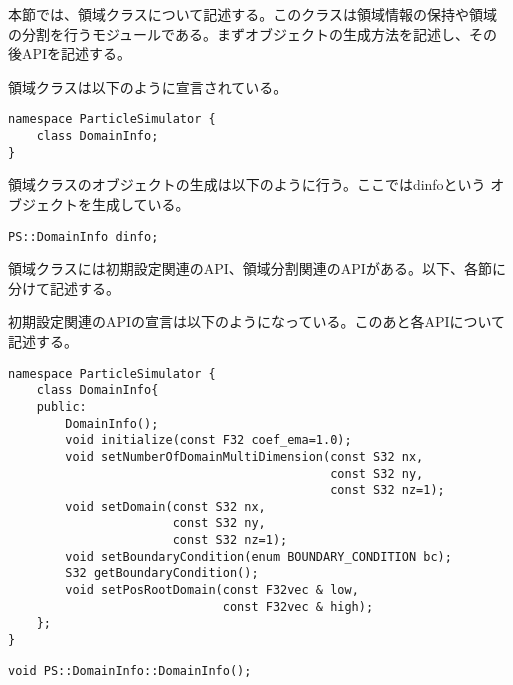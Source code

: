 本節では、領域クラスについて記述する。このクラスは領域情報の保持や領域
の分割を行うモジュールである。まずオブジェクトの生成方法を記述し、その
後APIを記述する。


領域クラスは以下のように宣言されている。
\begin{lstlisting}[caption=DomainInfo0]
namespace ParticleSimulator {
    class DomainInfo;
}
\end{lstlisting}

領域クラスのオブジェクトの生成は以下のように行う。ここではdinfoという
オブジェクトを生成している。
\begin{screen}
\begin{verbatim}
PS::DomainInfo dinfo;
\end{verbatim}
\end{screen}


領域クラスには初期設定関連のAPI、領域分割関連のAPIがある。以下、各節に
分けて記述する。


初期設定関連のAPIの宣言は以下のようになっている。このあと各APIについて
記述する。
\begin{lstlisting}[caption=DomainInfo1]
namespace ParticleSimulator {
    class DomainInfo{
    public:
        DomainInfo();
        void initialize(const F32 coef_ema=1.0);
        void setNumberOfDomainMultiDimension(const S32 nx,
                                             const S32 ny,
                                             const S32 nz=1);
        void setDomain(const S32 nx,
                       const S32 ny,
                       const S32 nz=1);
        void setBoundaryCondition(enum BOUNDARY_CONDITION bc);
        S32 getBoundaryCondition();
        void setPosRootDomain(const F32vec & low,
                              const F32vec & high);
    };
}
\end{lstlisting}


\begin{screen}
\begin{verbatim}
void PS::DomainInfo::DomainInfo();
\end{verbatim}
\end{screen}

